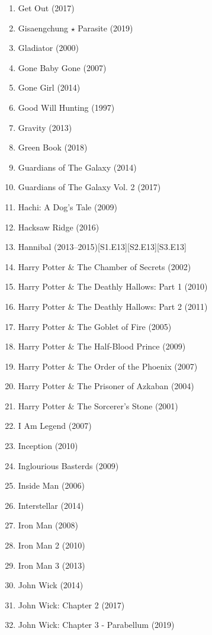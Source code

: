\documentclass{article}
\begin{document}
\begin{enumerate}
	\item {\sc Get Out} (2017)
	\item {\sc Gisaengchung $\star$ Parasite} (2019)
	\item {\sc Gladiator} (2000)
	\item {\sc Gone Baby Gone} (2007)
	\item {\sc Gone Girl} (2014)
	\item {\sc Good Will Hunting} (1997)
	\item {\sc Gravity} (2013)
	\item {\sc Green Book} (2018)
	\item {\sc Guardians of The Galaxy} (2014)
	\item {\sc Guardians of The Galaxy Vol. 2} (2017)
	\item {\sc Hachi: A Dog's Tale} (2009)
	\item {\sc Hacksaw Ridge} (2016)
	\item {\sc Hannibal} (2013--2015)\hfill[S1.E13][S2.E13][S3.E13]
	\item {\sc Harry Potter \& The Chamber of Secrets} (2002)
	\item {\sc Harry Potter \& The Deathly Hallows: Part 1} (2010)
	\item {\sc Harry Potter \& The Deathly Hallows: Part 2} (2011)
	\item {\sc Harry Potter \& The Goblet of Fire} (2005)
	\item {\sc Harry Potter \& The Half-Blood Prince} (2009)
	\item {\sc Harry Potter \& The Order of the Phoenix} (2007)
	\item {\sc Harry Potter \& The Prisoner of Azkaban} (2004)
	\item {\sc Harry Potter \& The Sorcerer's Stone} (2001)
	\item {\sc I Am Legend} (2007)
	\item {\sc Inception} (2010)
	\item {\sc Inglourious Basterds} (2009)
	\item {\sc Inside Man} (2006)
	\item {\sc Interstellar} (2014)
	\item {\sc Iron Man} (2008)
	\item {\sc Iron Man 2} (2010)
	\item {\sc Iron Man 3} (2013)
	\item {\sc John Wick} (2014)
	\item {\sc John Wick: Chapter 2} (2017)
	\item {\sc John Wick: Chapter 3 - Parabellum} (2019)

\end{enumerate}
\end{document}
